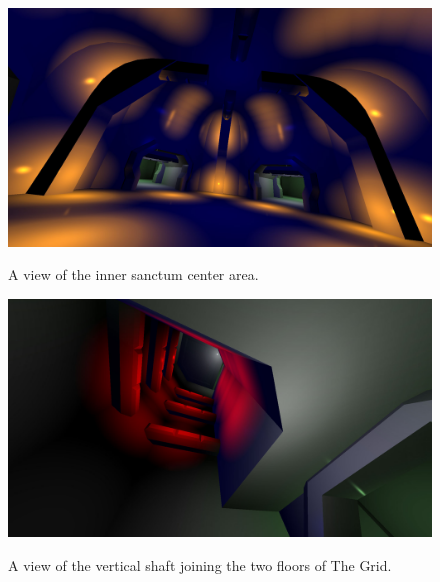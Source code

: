 \documentclass[12pt]{ucthesis}
\newcommand{\captionfonts}{\small\bf\ssp}
\begin{document}
\begin{figure}
\begin{center}
\includegraphics[width=\textwidth]{Images/GridInnerSanctum.jpg}
\captionfonts
\caption[Grid Inner Sanctum]{A view of the inner sanctum center area.}
\label{fig:grid-inner-sanctum}

\includegraphics[width=\textwidth]{Images/GridShaft.jpg}
\captionfonts
\caption[Grid Shaft]{A view of the vertical shaft joining the two floors of The Grid.}
\label{fig:grid-shaft}

\end{center}
\end{figure}
\end{document}
